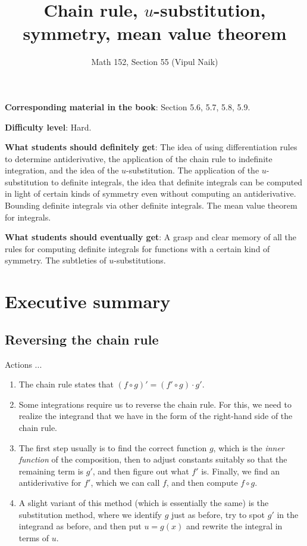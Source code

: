 \documentclass{amsart}
\title{Chain rule, $u$-substitution, symmetry, mean value theorem}
\author{Math 152, Section 55 (Vipul Naik)}
\begin{document}
\maketitle

{\bf Corresponding material in the book}: Section 5.6, 5.7, 5.8, 5.9.

{\bf Difficulty level}: Hard.

{\bf What students should definitely get}: The idea of using
differentiation rules to determine antiderivative, the application of
the chain rule to indefinite integration, and the idea of the
$u$-substitution. The application of the $u$-substitution to definite
integrals, the idea that definite integrals can be computed in light
of certain kinds of symmetry even without computing an
antiderivative. Bounding definite integrals via other definite
integrals. The mean value theorem for integrals.

{\bf What students should eventually get}: A grasp and clear memory of
all the rules for computing definite integrals for functions with a
certain kind of symmetry. The subtleties of $u$-substitutions.

\section*{Executive summary}

\subsection{Reversing the chain rule}

Actions ...

\begin{enumerate}
\item The chain rule states that $(f \circ g)' = (f' \circ g) \cdot
  g'$.
\item Some integrations require us to reverse the chain rule. For
  this, we need to realize the integrand that we have in the form of the
  right-hand side of the chain rule.
\item The first step usually is to find the correct function $g$,
  which is the {\em inner function} of the composition, then to adjust
  constants suitably so that the remaining term is $g'$, and then
  figure out what $f'$ is. Finally, we find an antiderivative for
  $f'$, which we can call $f$, and then compute $f \circ g$.
\item A slight variant of this method (which is essentially the same)
  is the substitution method, where we identify $g$ just as before,
  try to spot $g'$ in the integrand as before, and then put $u = g(x)$
  and rewrite the integral in terms of $u$.
\end{enumerate}
\end{document}

